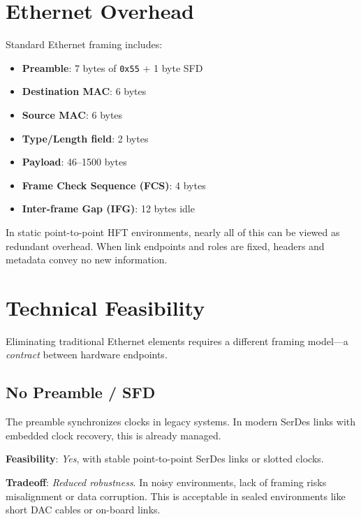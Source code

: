 \documentclass[HFT-main.tex]{subfiles} %
\begin{document}
\section{Ethernet Overhead}

Standard Ethernet framing includes:
\begin{itemize}
  \item \textbf{Preamble}: 7 bytes of \texttt{0x55} + 1 byte SFD
  \item \textbf{Destination MAC}: 6 bytes
  \item \textbf{Source MAC}: 6 bytes
  \item \textbf{Type/Length field}: 2 bytes
  \item \textbf{Payload}: 46--1500 bytes
  \item \textbf{Frame Check Sequence (FCS)}: 4 bytes
  \item \textbf{Inter-frame Gap (IFG)}: 12 bytes idle
\end{itemize}

In static point-to-point HFT environments, nearly all of this can be viewed as redundant overhead. When link endpoints and roles are fixed, headers and metadata convey no new information.

\section{Technical Feasibility}

Eliminating traditional Ethernet elements requires a different framing model---a \textit{contract} between hardware endpoints.

\subsection*{No Preamble / SFD}

The preamble synchronizes clocks in legacy systems. In modern SerDes links with embedded clock recovery, this is already managed.

\textbf{Feasibility}: \emph{Yes}, with stable point-to-point SerDes links or slotted clocks.

\textbf{Tradeoff}: \emph{Reduced robustness}. In noisy environments, lack of framing risks misalignment or data corruption. This is acceptable in sealed environments like short DAC cables or on-board links.
\end{document}
